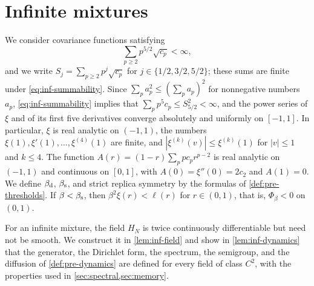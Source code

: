 \section{Infinite mixtures}\label{sec:inf-mixtures}

We consider covariance functions satisfying
\begin{equation}\label{eq:inf-summability}
\sum_{p\ge2}p^{5/2}\sqrt{c_p}<\infty,
\end{equation}
and we write $S_j=\sum_{p\ge2}p^j\sqrt{c_p}$ for $j\in\{1/2,3/2,5/2\}$; these sums are finite under \eqref{eq:inf-summability}. Since $\sum_pa_p^2\le(\sum_pa_p)^2$ for nonnegative numbers $a_p$, \eqref{eq:inf-summability} implies that $\sum_pp^5c_p\le S_{5/2}^2<\infty$, and the power series of $\xi$ and of its first five derivatives converge absolutely and uniformly on $[-1,1]$. In particular, $\xi$ is real analytic on $(-1,1)$, the numbers $\xi(1),\xi'(1),\dots,\xi^{(4)}(1)$ are finite, and $|\xi^{(k)}(v)|\le\xi^{(k)}(1)$ for $|v|\le1$ and $k\le4$. The function $A(r)=(1-r)\sum_ppc_pr^{p-2}$ is real analytic on $(-1,1)$ and continuous on $[0,1]$, with $A(0)=\xi''(0)=2c_2$ and $A(1)=0$. We define $\beta_{\mathrm d}$, $\beta_{\mathrm s}$, and strict replica symmetry by the formulas of \cref{def:pre-thresholds}. If $\beta<\beta_{\mathrm s}$, then $\beta^2\xi(r)<\ell(r)$ for $r\in(0,1)$, that is, $\Phi_\beta<0$ on $(0,1)$.

For an infinite mixture, the field $H_N$ is twice continuously differentiable but need not be smooth. We construct it in \cref{lem:inf-field} and show in \cref{lem:inf-dynamics} that the generator, the Dirichlet form, the spectrum, the semigroup, and the diffusion of \cref{def:pre-dynamics} are defined for every field of class $C^2$, with the properties used in \cref{sec:spectral,sec:memory}.

